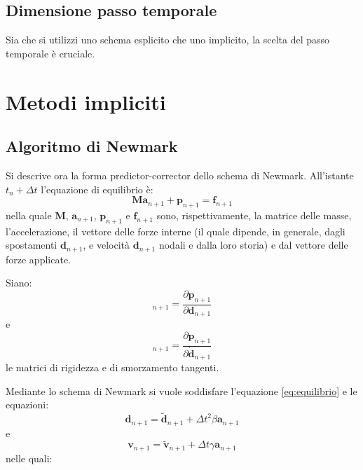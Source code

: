 \subsection{Dimensione passo temporale}
Sia che si utilizzi uno schema esplicito che uno implicito, la scelta del passo temporale è cruciale.


\section{Metodi impliciti}

\subsection{Algoritmo di Newmark}
Si descrive ora la forma predictor-corrector dello schema di Newmark. All'istante $t_n + \varDelta t$ l'equazione di equilibrio è:
\begin{equation}
	\boldsymbol{M a}_{n+1} +\boldsymbol{p}_{n+1} = \boldsymbol{f}_{n+1}
	\label{eq:equilibrio}
\end{equation}
nella quale $\boldsymbol{M}$, $\boldsymbol{a}_{n+1}$, $\boldsymbol{p}_{n+1}$ e $\boldsymbol{f}_{n+1}$ sono, rispettivamente, la matrice delle masse, l'accelerazione, il vettore delle forze interne (il quale dipende, in generale, dagli spostamenti $\boldsymbol{d}_{n+1}$, e velocità $\boldsymbol{\dot{d}}_{n+1}$ nodali e dalla loro storia) e dal vettore delle forze applicate.

Siano:
\begin{equation}
	[\boldsymbol{K}_T]_{n+1} = \frac{\partial {\boldsymbol{p}_{n+1}}}{\partial {\boldsymbol{d}_{n+1}}}
\end{equation}
e
\begin{equation}
	[\boldsymbol{C}_T]_{n+1} = \frac{\partial {\boldsymbol{p}_{n+1}}}{\partial {\boldsymbol{\dot{d}}_{n+1}}}	
\end{equation}
le matrici di rigidezza e di smorzamento tangenti.

Mediante lo schema di Newmark si vuole soddisfare l'equazione \ref{eq:equilibrio} e le equazioni:
\begin{equation}
	\boldsymbol{d}_{n+1} = \boldsymbol{\tilde{d}}_{n+1} + {\varDelta t}^2  \beta \boldsymbol{a}_{n+1}
\end{equation}
e
\begin{equation}
	\boldsymbol{v}_{n+1} = \boldsymbol{\tilde{v}}_{n+1} + {\varDelta t} \gamma \boldsymbol{a}_{n+1}
\end{equation}
nelle quali:

